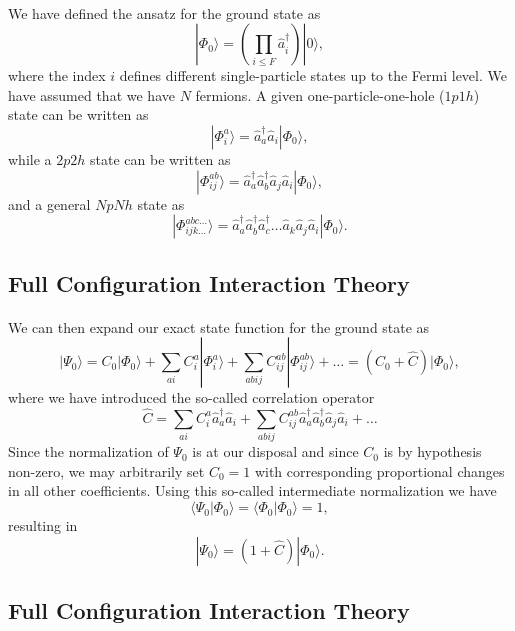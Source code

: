 \documentclass[%
oneside,                 %
final,                   %
10pt]{article}
\begin{document}
\paragraph{}
We have defined the ansatz for the ground state as 
\[
|\Phi_0\rangle = \left(\prod_{i\le F}\hat{a}_{i}^{\dagger}\right)|0\rangle,
\]
where the index $i$ defines different single-particle states up to the Fermi level. We have assumed that we have $N$ fermions. 
A given one-particle-one-hole ($1p1h$) state can be written as
\[
|\Phi_i^a\rangle = \hat{a}_{a}^{\dagger}\hat{a}_i|\Phi_0\rangle,
\]
while a $2p2h$ state can be written as
\[
|\Phi_{ij}^{ab}\rangle = \hat{a}_{a}^{\dagger}\hat{a}_{b}^{\dagger}\hat{a}_j\hat{a}_i|\Phi_0\rangle,
\]
and a general $NpNh$ state as 
\[
|\Phi_{ijk\dots}^{abc\dots}\rangle = \hat{a}_{a}^{\dagger}\hat{a}_{b}^{\dagger}\hat{a}_{c}^{\dagger}\dots\hat{a}_k\hat{a}_j\hat{a}_i|\Phi_0\rangle.
\]



\subsection*{Full Configuration Interaction Theory}

\paragraph{}
We can then expand our exact state function for the ground state 
as
\[
|\Psi_0\rangle=C_0|\Phi_0\rangle+\sum_{ai}C_i^a|\Phi_i^a\rangle+\sum_{abij}C_{ij}^{ab}|\Phi_{ij}^{ab}\rangle+\dots
=(C_0+\hat{C})|\Phi_0\rangle,
\]
where we have introduced the so-called correlation operator 
\[
\hat{C}=\sum_{ai}C_i^a\hat{a}_{a}^{\dagger}\hat{a}_i  +\sum_{abij}C_{ij}^{ab}\hat{a}_{a}^{\dagger}\hat{a}_{b}^{\dagger}\hat{a}_j\hat{a}_i+\dots
\]
Since the normalization of $\Psi_0$ is at our disposal and since $C_0$ is by hypothesis non-zero, we may arbitrarily set $C_0=1$ with 
corresponding proportional changes in all other coefficients. Using this so-called intermediate normalization we have
\[
\langle \Psi_0 | \Phi_0 \rangle = \langle \Phi_0 | \Phi_0 \rangle = 1, 
\]
resulting in 
\[
|\Psi_0\rangle=(1+\hat{C})|\Phi_0\rangle.
\]



\subsection*{Full Configuration Interaction Theory}
\end{document}

